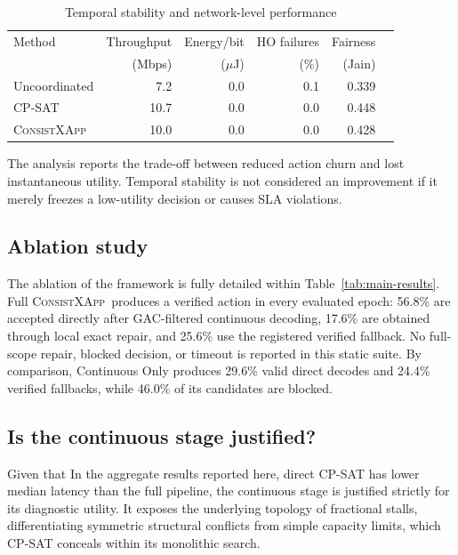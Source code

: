 \documentclass[pdflatex,sn-mathphys-num,iicol,oneside]{sn-jnl}
\newcommand{\method}{\textsc{ConsistXApp}}
\begin{document}
\begin{table}[t]
\centering
\caption{Temporal stability and network-level performance}
\label{tab:temporal-results}
\begin{tabular}{lrrrrr}
\toprule
Method & Throughput & Energy/bit & HO failures & Fairness\\
& (Mbps) & ($\mu$J) & (\%) & (Jain)\\
\midrule
Uncoordinated & 7.2 & 0.0 & 0.1 & 0.339 \\
CP-SAT & 10.7 & 0.0 & 0.0 & 0.448 \\
\method & 10.0 & 0.0 & 0.0 & 0.428 \\
\bottomrule
\end{tabular}
\end{table}

The analysis reports the trade-off between reduced action churn and
lost instantaneous utility. Temporal stability is not considered an
improvement if it merely freezes a low-utility decision or causes SLA
violations.

\subsection{Ablation study}

The ablation of the framework is fully detailed within Table~\ref{tab:main-results}. Full \method\ produces a verified action in every evaluated epoch: 56.8\% are accepted directly after GAC-filtered continuous decoding, 17.6\% are obtained through local exact repair, and 25.6\% use the registered verified fallback. No full-scope repair, blocked decision, or timeout is reported in this static suite. By comparison, Continuous Only produces 29.6\% valid direct decodes and 24.4\% verified fallbacks, while 46.0\% of its candidates are blocked.

\subsection{Is the continuous stage justified?}

Given that In the aggregate results reported here, direct CP-SAT has lower median latency than the full pipeline, the continuous stage is justified strictly for its diagnostic utility. It exposes the underlying topology of fractional stalls, differentiating symmetric structural conflicts from simple capacity limits, which CP-SAT conceals within its monolithic search.
\end{document}
